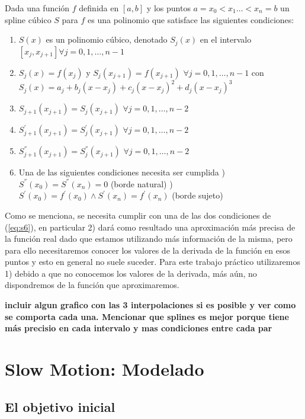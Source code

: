 Dada una función $f$ definida en $[a, b]$ y los puntos $a = x_0 < x_1 \dots < x_n = b$ un spline cúbico $S$ para $f$ es una polinomio que satisface las siguientes condiciones:

\begin{enumerate}
\item $S(x)$ es un polinomio cúbico, denotado $S_j(x)$ en el intervalo $[x_j, x_{j+1}] \forall j = 0, 1, \dots, n-1$ \label{eq:s1}
\item $S_j(x) = f(x_j)$ y $S_j(x_{j+1}) = f(x_{j+1})$ $\forall j = 0, 1, \dots, n-1$ con $S_j(x) = a_j + b_j(x - x_j) + c_j(x - x_j)^2 + d_j(x - x_j)^3$ \label{eq:s2}
\item $S_{j+1}(x_{j+1}) = S_j(x_{j+1})$ $\forall j = 0, 1, \dots, n-2$ \label{eq:s3}
\item $S_{j+1}^{'}(x_{j+1}) = S_j^{'}(x_{j+1})$ $\forall j = 0, 1, \dots, n-2$ \label{eq:s4}
\item $S_{j+1}^{''}(x_{j+1}) = S_j^{''}(x_{j+1})$ $\forall j = 0, 1, \dots, n-2$ \label{eq:s5}
\item Una de las siguientes condiciones necesita ser cumplida \label{eq:s6}
) $S^{''}(x_0) = S^{''}(x_n) = 0$ (borde natural) 
) $S^{'}(x_0) =  f^{'}(x_0) \wedge S^{'}(x_n) = f^{'}(x_n)$ (borde sujeto) 
\end{enumerate}

Como se menciona, se necesita cumplir con una de las dos condiciones de (\ref{eq:s6}), en particular 2) dará como resultado una aproximación más precisa de la función real dado que estamos utilizando más información de la misma, pero para ello necesitaremos conocer los valores de la derivada de la función en esos puntos y esto en general no suele suceder. Para este trabajo práctico utilizaremos 1) debido a que no conocemos los valores de la derivada, más aún, no dispondremos de la función que aproximaremos.

\textbf{incluir algun grafico con las 3 interpolaciones si es posible y ver como se comporta cada una. Mencionar que splines es mejor porque tiene más precisio en cada intervalo y mas condiciones entre cada par}

\section{Slow Motion: Modelado}

\subsection{El objetivo inicial}

